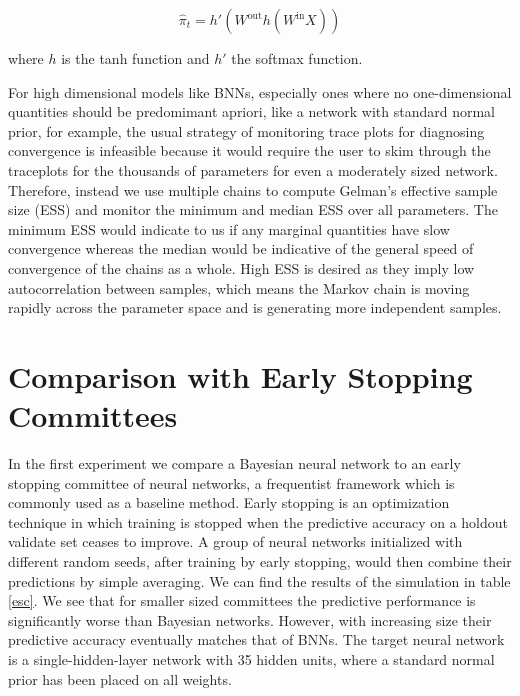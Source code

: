 \documentclass[12pt]{report}
\begin{document}
\[\hat{\pi}_t =   h'(W^{\text{out}}h(W^{\text{in}}X)) \]

where $h$ is the tanh function and $h'$ the softmax function.

For high dimensional models like BNNs, especially ones where no one-dimensional quantities should be predomimant apriori, like a network with standard normal prior, for example, the usual strategy of monitoring trace plots for diagnosing convergence is infeasible because it would require the user to skim through the traceplots for the thousands of parameters for even a moderately sized network. Therefore, instead we use multiple chains to compute Gelman's effective sample size (ESS) and monitor the minimum and median ESS over all parameters. The minimum ESS would indicate to us if any marginal quantities have slow convergence whereas the median would be indicative of the general speed of convergence of the chains as a whole. High ESS is desired as they imply low autocorrelation between samples, which means the Markov chain is moving rapidly across the parameter space and is generating more independent samples.

\section{Comparison with Early Stopping Committees}

In the first experiment we compare a Bayesian neural network to an early stopping committee of neural networks, a frequentist framework which is commonly used as a baseline method. Early stopping is an optimization technique in which training is stopped when the predictive accuracy on a holdout validate set ceases to improve. A group of neural networks initialized with different random seeds, after training by early stopping,  would then combine their predictions by simple averaging. We can find the results of the simulation in table \ref{esc}. We see that for smaller sized committees the predictive performance is significantly worse than Bayesian networks. However, with increasing size their predictive accuracy eventually matches that of BNNs. The target neural network is a single-hidden-layer network with 35 hidden units, where a standard normal prior has been placed on all weights. 
\end{document}
